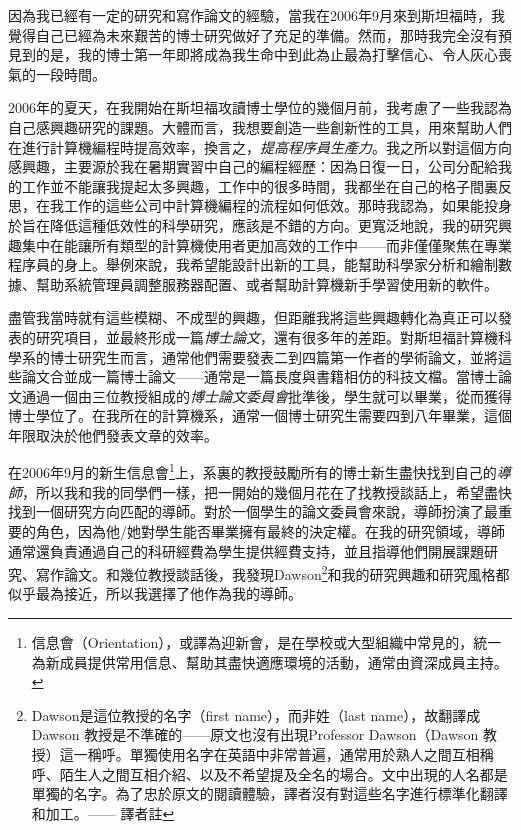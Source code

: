 \documentclass[12pt,UTF8,nofonts]{book}
\begin{document}
因為我已經有一定的研究和寫作論文的經驗，當我在2006年9月來到斯坦福時，我覺得自己已經為未來艱苦的博士研究做好了充足的準備。然而，那時我完全沒有預見到的是，我的博士第一年即將成為我生命中到此為止最為打擊信心、令人灰心喪氣的一段時間。



2006年的夏天，在我開始在斯坦福攻讀博士學位的幾個月前，我考慮了一些我認為自己感興趣研究的課題。大體而言，我想要創造一些創新性的工具，用來幫助人們在進行計算機編程時提高效率，換言之，\emph{提高程序員生產力}。我之所以對這個方向感興趣，主要源於我在暑期實習中自己的編程經歷：因為日復一日，公司分配給我的工作並不能讓我提起太多興趣，工作中的很多時間，我都坐在自己的格子間裏反思，在我工作的這些公司中計算機編程的流程如何低效。那時我認為，如果能投身於旨在降低這種低效性的科學研究，應該是不錯的方向。更寬泛地說，我的研究興趣集中在能讓所有類型的計算機使用者更加高效的工作中——而非僅僅聚焦在專業程序員的身上。舉例來說，我希望能設計出新的工具，能幫助科學家分析和繪制數據、幫助系統管理員調整服務器配置、或者幫助計算機新手學習使用新的軟件。

盡管我當時就有這些模糊、不成型的興趣，但距離我將這些興趣轉化為真正可以發表的研究項目，並最終形成一篇\emph{博士論文}，還有很多年的差距。對斯坦福計算機科學系的博士研究生而言，通常他們需要發表二到四篇第一作者的學術論文，並將這些論文合並成一篇博士論文——通常是一篇長度與書籍相仿的科技文檔。當博士論文通過一個由三位教授組成的\emph{博士論文委員會}批準後，學生就可以畢業，從而獲得博士學位了。在我所在的計算機系，通常一個博士研究生需要四到八年畢業，這個年限取決於他們發表文章的效率。

在2006年9月的新生信息會\footnote{信息會（Orientation），或譯為迎新會，是在學校或大型組織中常見的，統一為新成員提供常用信息、幫助其盡快適應環境的活動，通常由資深成員主持。}上，系裏的教授鼓勵所有的博士新生盡快找到自己的\emph{導師}，所以我和我的同學們一樣，把一開始的幾個月花在了找教授談話上，希望盡快找到一個研究方向匹配的導師。對於一個學生的論文委員會來說，導師扮演了最重要的角色，因為他/她對學生能否畢業擁有最終的決定權。在我的研究領域，導師通常還負責通過自己的科研經費為學生提供經費支持，並且指導他們開展課題研究、寫作論文。和幾位教授談話後，我發現Dawson\footnote{Dawson是這位教授的名字（first name），而非姓（last name），故翻譯成Dawson 教授是不準確的——原文也沒有出現Professor Dawson（Dawson 教授）這一稱呼。單獨使用名字在英語中非常普遍，通常用於熟人之間互相稱呼、陌生人之間互相介紹、以及不希望提及全名的場合。文中出現的人名都是單獨的名字。為了忠於原文的閱讀體驗，譯者沒有對這些名字進行標準化翻譯和加工。—— 譯者註}和我的研究興趣和研究風格都似乎最為接近，所以我選擇了他作為我的導師。
\end{document}
